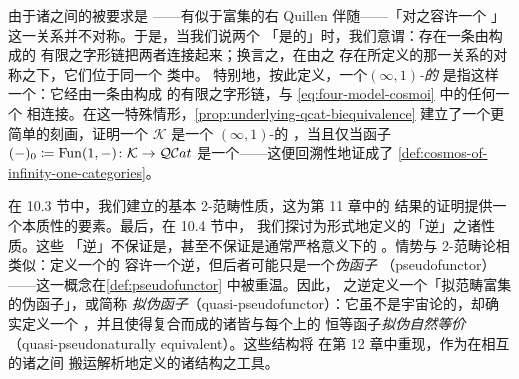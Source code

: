由于诸\trInfinityCosmos{}之间的\trBiequivalence{}被要求是%
\trCosmologicalFunctor——有似于富集的右 Quillen 伴随——「对之容许一个%
\trBiequivalence」这一关系并不对称。于是，当我们说两个\trInfinityCosmos{}
「是\trBiequivalence{}的」时，我们意谓：存在一条由\trBiequivalence{}构成的
有限之字形链把两者连接起来；换言之，在由\trCosmologicalBiequivalence{}之
存在所定义的那一关系的对称\trTransitiveClosure{}之下，它们位于同一个%
\trEquivalence{}类中。
特别地，按此定义，一个\emph{$(\infty,1)$-\trCategory{}的\trInfinityCosmos}
是指这样一个\trInfinityCosmos：它经由一条由\trCosmologicalBiequivalence{}构成
的有限之字形链，与 \eqref{eq:four-model-cosmoi} 中的任何一个\trInfinityCosmos
相连接。在这一特殊情形，\cref{prop:underlying-qcat-biequivalence} 建立了一个更简单的刻画，证明一个%
\trInfinityCosmos{} $\mathcal{K}$ 是一个 $(\infty,1)$-\trCategory{}的%
\trInfinityCosmos，当且仅当\trUnderlyingQuasiCategory{}函子
$(-)_0\coloneqq\operatorname{Fun}(1,-)\colon\mathcal{K}\to\mathcal{Q}\mathcal{C}at$
是一个\trCosmologicalBiequivalence——这便回溯性地证成了%
\cref{def:cosmos-of-infinity-one-categories}。

在 10.3 节中，我们建立\trBiequivalence{}的基本 2-范畴性质，这为第 11 章中的%
\trModelIndependence{}结果的证明提供一个本质性的要素。最后，在 10.4 节中，
我们探讨为\trCosmologicalBiequivalence{}形式地定义的「逆」之诸性质。这些
「逆」不保证是\trCosmologicalFunctor，甚至不保证是通常严格意义下的%
\trSimplicialFunctor。情势与 2-范畴论相类似：定义一个\trBiequivalence{}的%
\trTwoFunctor{}容许一个逆\trBiequivalence，但后者可能只是一个\emph{伪函子}
（pseudofunctor）——这一概念在\cref{def:pseudofunctor} 中被重温。因此，%
\trCosmologicalBiequivalence{}之逆定义一个「拟范畴富集的伪函子」，或简称
\emph{拟伪函子}（quasi-pseudofunctor）：它虽不是宇宙论的，却确实定义一个%
\trBiequivalence，并且使得复合而成的诸\trEndofunctor{}皆与每个\trInfinityCosmos{}上的
恒等函子\emph{拟伪自然等价}（quasi-pseudonaturally equivalent）。这些结构将
在第 12 章中重现，作为在相互\trBiequivalence{}的诸\trInfinityCosmos{}之间
搬运解析地定义的诸结构之工具。

